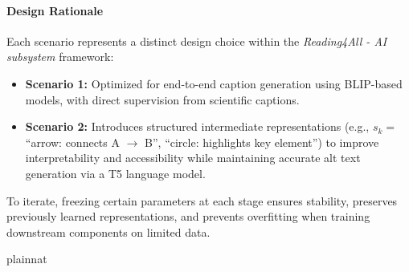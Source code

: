 \documentclass[12pt, titlepage]{article}
\begin{document}
\paragraph{Design Rationale}
Each scenario represents a distinct design choice within the \textit{Reading4All - AI subsystem} framework:

\begin{itemize}
    \item \textbf{Scenario 1:} Optimized for end-to-end caption generation using BLIP-based models, with direct supervision from scientific captions.
    \item \textbf{Scenario 2:} Introduces structured intermediate representations (e.g., $s_k =$ ``arrow: connects A $\rightarrow$ B'', ``circle: highlights key element'') to improve interpretability and accessibility while maintaining accurate alt text generation via a T5 language model.
\end{itemize}

To iterate, freezing certain parameters at each stage ensures stability, preserves previously learned representations, and prevents overfitting when training downstream components on limited data.

\newpage
 {plainnat}


\newpage{}
\end{document}
